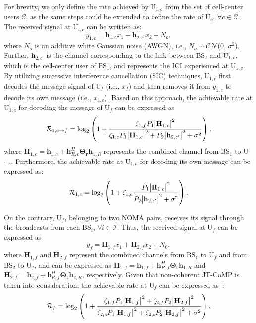 \documentclass[conference]{IEEEtran}
\begin{document}
For brevity, we only define the rate achieved by U$_{1,c}$ from the set of cell-center users $\mathcal{C}$, as the same steps could be extended to define the rate of U$_c$, $\forall c \in \mathcal{C}$. The received signal at U$_{i,c}$ can be written as:
\begin{equation}
    y_{1,c}=\textbf{h}_{1,c}x_1 + \textbf{h}_{2,c^\prime} x_2 + N_o,
\end{equation}
where $N_o$ is an additive white Gaussian noise (AWGN), i.e., $N_o\sim \mathcal{CN}$(0, $\sigma^2$). Further, $\textbf{h}_{2,c^\prime}$ is the channel corresponding to the link between BS$_2$ and U$_{1,c}$, which is the cell-center user of BS$_1$, and represents the ICI experienced at U$_{1,c}$. By utilizing successive interference cancellation (SIC) techniques, U$_{1,c}$ first decodes the message signal of U$_f$ (i.e., $x_f$) and then removes it from $y_{1,c}$ to decode its own message (i.e., $x_{1,c}$). Based on this approach, the achievable rate at U$_{1,c}$ for decoding the message of U$_f$ can be expressed as
\begin{equation}
    \mathcal{R}_{1,c\rightarrow f}=\log_2\left(1+\frac{\zeta_{1,f}P_1\abs{\textbf{H}_{1, c}}^2}{\zeta_{1,c}P_1\abs{\textbf{H}_{1, c}}^2 + P_2\abs{\textbf{h}_{2,c^\prime}}^2 +  \sigma^2}\right),
\end{equation}
where $\textbf{H}_{1, c}=\textbf{h}_{1, c}+\textbf{h}_{R, c}^H \mathbf{\Theta_r}\textbf{h}_{1, R}$ represents the combined channel from BS$_1$ to U$_{1,c}$. Furthermore, the achievable rate at U$_{1,c}$ for decoding its own message can be expressed as:
\begin{equation}
    \mathcal{R}_{1,c}=\log_2\left(1+\zeta_{1,c}\frac{P_1\abs{\textbf{H}_{1, c}}^2}{P_2\abs{\textbf{h}_{2,c^\prime}}^2 + \sigma^2}\right).
\end{equation}

On the contrary, U$_f$, belonging to two NOMA pairs, receives its signal through the broadcasts from each BS$_i$, $\forall i \in \mathcal{I}$. Thus, the received signal at U$_f$ can be expressed as
\begin{equation}
    y_f = \textbf{H}_{1, f}x_1 + \textbf{H}_{2, f}x_2 + N_0,
\end{equation}
where $\textbf{H}_{1, f}$ and $\textbf{H}_{2, f}$ represent the combined channels from BS$_1$ to U$_f$ and from BS$_2$ to U$_f$, and can be expressed as $\textbf{H}_{1, f}=\textbf{h}_{1, f}+\textbf{h}_{R, f}^H \mathbf{\Theta_t}\textbf{h}_{1, R}$ and $\textbf{H}_{2, f}=\textbf{h}_{2, f}+\textbf{h}_{R, f}^H \mathbf{\Theta_t}\textbf{h}_{2, R}$, respectively. Given that non-coherent JT-CoMP is taken into consideration, the achievable rate at U$_f$ can be expressed as~\cite{tanbourgi2014tractable, elhattab2022ris}:
\begin{equation}
    \mathcal{R}_{f}=\log_2\left(1 + \frac{\zeta_{1,f}P_1\abs{\textbf{H}_{1, f}}^2 + \zeta_{2,f}P_2\abs{\textbf{H}_{2, f}}^2}{\zeta_{2,c}P_1\abs{\textbf{H}_{1, f}}^2 + \zeta_{2,c}P_2\abs{\textbf{H}_{2, f}}^2 + \sigma^2}\right),
\end{equation}
\end{document}
